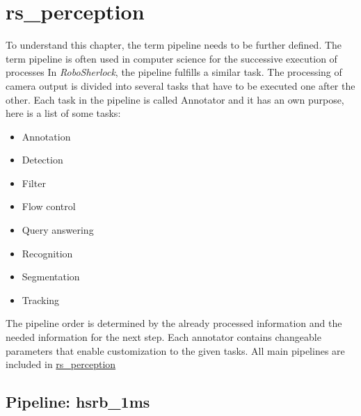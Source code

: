 \documentclass[main.tex]{subfiles}
\begin{document}
        \section{rs\_perception}\label{rs_perception}
To understand this chapter, the term pipeline needs to be further defined. The term pipeline is often used in computer science for the successive execution of processes
In \textit{RoboSherlock}, the pipeline fulfills a similar task. The processing of camera output is divided into several tasks that have to be executed one after the other.
Each task in the pipeline is called Annotator and it has an own purpose, here is a list of some tasks: 
        \begin{itemize}
            \item Annotation
            \item Detection
            \item Filter
            \item Flow control
            \item Query answering
            \item Recognition 
            \item Segmentation
            \item Tracking
        \end{itemize}        
The pipeline order is determined by the already processed information and the needed information for the next step.
Each annotator contains changeable parameters that enable customization to the given tasks. All main pipelines are included in \href{https://github.com/SUTURO/suturo_perception/tree/master/rs_perception}{rs\_perception}

            \subsection{Pipeline: hsrb\_1ms}
\end{document}
